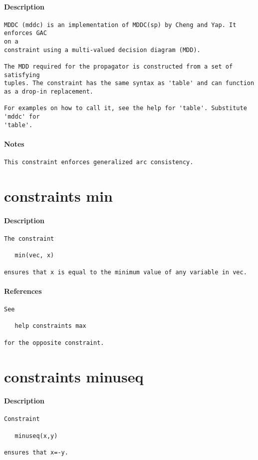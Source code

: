 \paragraph{Description}
{\footnotesize
\begin{verbatim}
MDDC (mddc) is an implementation of MDDC(sp) by Cheng and Yap. It enforces GAC
on a
constraint using a multi-valued decision diagram (MDD).

The MDD required for the propagator is constructed from a set of satisfying
tuples. The constraint has the same syntax as 'table' and can function
as a drop-in replacement.

For examples on how to call it, see the help for 'table'. Substitute 'mddc' for
'table'.
\end{verbatim}
}
\paragraph{Notes}
{\footnotesize
\begin{verbatim}
This constraint enforces generalized arc consistency.
\end{verbatim}
}
\section{constraints min}
\paragraph{Description}
{\footnotesize
\begin{verbatim}
The constraint

   min(vec, x)

ensures that x is equal to the minimum value of any variable in vec.
\end{verbatim}
}
\paragraph{References}
{\footnotesize
\begin{verbatim}
See

   help constraints max

for the opposite constraint.
\end{verbatim}
}
\section{constraints minuseq}
\paragraph{Description}
{\footnotesize
\begin{verbatim}
Constraint

   minuseq(x,y)

ensures that x=-y.
\end{verbatim}
}
